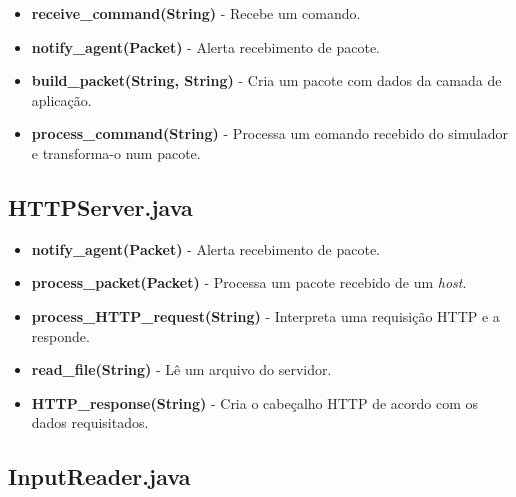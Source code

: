 \documentclass[11pt]{article}
\begin{document}
\begin{itemize}
	\item \textbf{receive_command(String)} - Recebe um comando.
	\item \textbf{notify_agent(Packet)} - Alerta recebimento de pacote.
	\item \textbf{build_packet(String, String)} - Cria um pacote com dados da camada de aplicação.
	\item \textbf{process_command(String)} - Processa um comando recebido do simulador e transforma-o num pacote.
\end{itemize}

\subsection{HTTPServer.java}

\begin{itemize}
	\item \textbf{notify_agent(Packet)} - Alerta recebimento de pacote.
	\item \textbf{process_packet(Packet)} - Processa um pacote recebido de um \textit{host}.
	\item \textbf{process_HTTP_request(String)} - Interpreta uma requisição HTTP e a responde.
	\item \textbf{read_file(String)} - Lê um arquivo do servidor.
	\item \textbf{HTTP_response(String)} - Cria o cabeçalho HTTP de acordo com os dados requisitados.
\end{itemize}

\subsection{InputReader.java}
\end{document}
